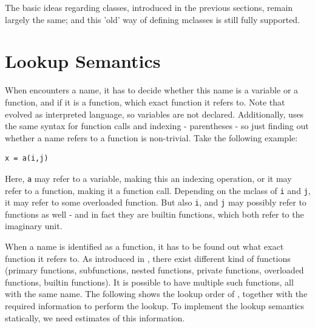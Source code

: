 The basic ideas regarding \matlab classes, introduced in the previous
sections, remain largely the same; and this 'old' way of defining
mclasses is still fully supported.

\section{\matlab Lookup Semantics}
\label{sec:lookup}

When \matlab encounters a name, it has to decide whether this name is
a variable or a function, and if it is a function, which exact
function it refers to. Note that \matlab evolved as  interpreted
language, so variables are not declared. Additionally, \matlab uses
the same syntax for function calls and indexing - parentheses - so
just finding out whether a name refers to a function is non-trivial.
Take the following example:

\begin{lstlisting}
x = a(i,j)
\end{lstlisting}

Here, \lstinline{a} may refer to a variable, making this an indexing
operation, or it may refer to a function, making it a function
call. Depending on the mclass of \lstinline{i} and \lstinline{j}, it
may refer to some overloaded function.  But also \lstinline{i}, and
\lstinline{j} may possibly refer to functions as well - and in 
fact they are \matlab builtin functions, which both refer to the imaginary unit.

When a name is identified as a function, it has to be found out what
exact function it refers to. As introduced in ,
there exist different
kind of functions (primary functions, subfunctions, nested functions,
private functions, overloaded functions, builtin functions). It is
possible to have multiple such functions, all with the same name. The
following shows the lookup order of \matlab, together with the
required information to perform the lookup. To implement the \matlab
lookup semantics statically, we need estimates of this information.


